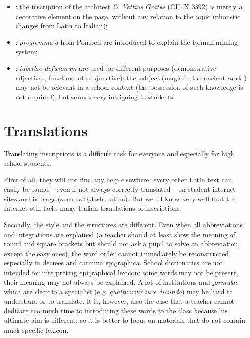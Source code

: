 \documentclass[amsthm,ebook]{saparticle}
\begin{document}
\begin{itemize}
\item \citet[39]{Barbieri2015}: the inscription of the architect \emph{C. Vettius Gratus} (CIL X 3392) is
merely a decorative element on the page, without any relation to the topic (phonetic changes from Latin to Italian);

\item \citet[40]{Domenici2012}: \emph{programmata} from Pompeii are introduced to explain the Roman
naming system;

\item \citet[269-270]{Gambis2013}: \emph{tabellae defixionum} are used for
different purposes (demonstrative adjectives, functions of subjunctive); the subject (magic in the ancient world) may
not be relevant in a school context (the possession of such knowledge is not required), but sounds very intriguing to
students.
\end{itemize}



\section{Translations}
\noindent Translating inscriptions is a difficult task for everyone and especially for high school students.

First of all, they will not find any help elsewhere: every other Latin text can easily be found – even if not always
correctly translated – on student internet sites and in blogs (such as Splash Latino). But we all know very well that
the Internet still lacks many Italian translations of inscriptions.

Secondly, the style and the structures are different. Even when all abbreviations and integrations are explained (a
teacher should at least show the meaning of round and square brackets but should not ask a pupil to solve an
abbreviation, except the easy ones), the word order cannot immediately be reconstructed, especially in decrees and
carmina epigraphica. School dictionaries are not intended for interpreting epigraphical lexicon: some words may not be
present, their meaning may not always be explained. A lot of institutions and \emph{formulae} which are clear to a specialist
(e.g. \emph{quattuorvir iure dicundo}) may be hard to understand or to translate. It is, however, also the case that a teacher
cannot dedicate too much time to introducing these words to the class because his ultimate aim is different; so it is
better to focus on materials that do not contain much specific lexicon.
\end{document}
